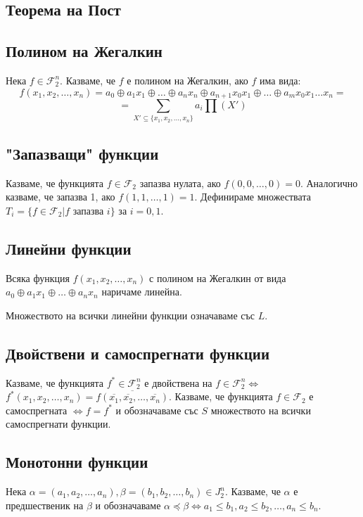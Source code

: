 \documentclass[fleqn,12pt]{article}
\begin{document}
\begin{flushleft}
\section{Теорема на Пост}
\subsection{Полином на Жегалкин}
Нека $f \in \mathcal{F}_2^n$. Казваме, че $f$ е полином на Жегалкин, ако $f$ има вида:
\[ f(x_1, x_2, \dots, x_n) = a_0 \oplus a_1 x_1 \oplus \dots \oplus a_n x_n \oplus a_{n+1} x_0 x_1 \oplus \dots \oplus a_m x_0 x_1 \dots x_n = \]
\[ = \sum_{X' \subseteq \{x_1, x_2, \dots, x_n\}} a_i \prod(X') \]

\subsection{"Запазващи" функции}
Казваме, че функцията $f \in \mathcal{F}_2$ запазва нулата, ако $f(0, 0, \dots, 0) = 0$.
Аналогично казваме, че запазва 1, ако $f(1, 1, \dots, 1) = 1$.
Дефинираме множествата $T_i = \{f \in \mathcal{F}_2 | f \text{ запазва } i\}$ за $i=0,1$.

\subsection{Линейни функции}

Всяка функция $f(x_1, x_2, \dots, x_n)$ с полином на Жегалкин от вида $a_0 \oplus a_1 x_1 \oplus \dots \oplus a_n x_n$ наричаме линейна.

Множеството на всички линейни функции означаваме със $L$.

\subsection{Двойствени и самоспрегнати функции}
Казваме, че функцията $f^* \in \mathcal{F}_2^n$ е двойствена на $f \in \mathcal{F}_2^n \Leftrightarrow$
$f^*(x_1, x_2, \dots, x_n) = \overline{f(\overline{x_1}, \overline{x_2}, \dots, \overline{x_n})}$.
Казваме, че функцията $f \in \mathcal{F}_2$ е самоспрегната $\Leftrightarrow f = f^*$ и обозначаваме със $S$ множеството
на всички самоспрегнати функции.

\subsection{Монотонни функции}
Нека $\alpha = (a_1, a_2, \dots, a_n), \beta = (b_1, b_2, \dots, b_n) \in J_2^n$. Казваме, че
$\alpha$ е предшественик на $\beta$ и обозначаваме $\alpha \preceq \beta \Leftrightarrow a_1 \leq b_1, a_2 \leq b_2, \dots, a_n \leq b_n$.


\end{flushleft}
\end{document}
